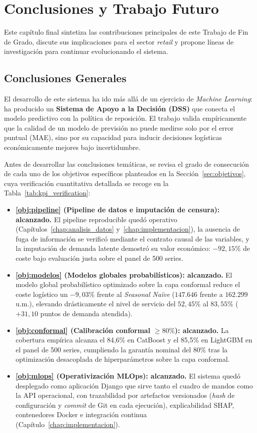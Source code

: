 \chapter{Conclusiones y Trabajo Futuro}
\label{chap:conclusiones}

Este capítulo final sintetiza las contribuciones principales de este Trabajo de Fin de Grado, discute sus implicaciones para el sector \textit{retail} y propone líneas de investigación para continuar evolucionando el sistema.

\section{Conclusiones Generales}
El desarrollo de este sistema ha ido más allá de un ejercicio de \textit{Machine Learning}: ha producido un \textbf{Sistema de Apoyo a la Decisión (DSS)} que conecta el modelo predictivo con la política de reposición. El trabajo valida empíricamente que la calidad de un modelo de previsión no puede medirse solo por el error puntual (MAE), sino por su capacidad para inducir decisiones logísticas económicamente mejores bajo incertidumbre.

Antes de desarrollar las conclusiones temáticas, se revisa el grado de consecución de cada uno de los objetivos específicos planteados en la Sección~\ref{sec:objetivos}, cuya verificación cuantitativa detallada se recoge en la Tabla~\ref{tab:kpi_verification}:

\begin{itemize}
    \item \textbf{\ref{obj:pipeline} (Pipeline de datos e imputación de censura): alcanzado.} El pipeline reproducible quedó operativo (Capítulos~\ref{chap:analisis_datos} y~\ref{chap:implementacion}), la ausencia de fuga de información se verificó mediante el contrato causal de las variables, y la imputación de demanda latente demostró su valor económico: $-92{,}15\%$ de coste bajo evaluación justa sobre el panel de 500 series.
    \item \textbf{\ref{obj:modelos} (Modelos globales probabilísticos): alcanzado.} El modelo global probabilístico optimizado sobre la capa conformal reduce el coste logístico un $-9{,}03\%$ frente al \textit{Seasonal Naïve} ($147.646$ frente a $162.299$ u.m.), elevando drásticamente el nivel de servicio del $52{,}45\%$ al $83{,}55\%$ ($+31{,}10$ puntos de demanda atendida).
    \item \textbf{\ref{obj:conformal} (Calibración conformal $\geq 80\%$): alcanzado.} La cobertura empírica alcanza el 84{,}6\% en CatBoost y el 85{,}5\% en LightGBM en el panel de 500 series, cumpliendo la garantía nominal del $80\%$ tras la optimización desacoplada de hiperparámetros sobre la capa conformal.
    \item \textbf{\ref{obj:mlops} (Operativización MLOps): alcanzado.} El sistema quedó desplegado como aplicación Django que sirve tanto el cuadro de mandos como la API operacional, con trazabilidad por artefactos versionados (\textit{hash} de configuración y \textit{commit} de Git en cada ejecución), explicabilidad SHAP, contenedores Docker e integración continua (Capítulo~\ref{chap:implementacion}).
\end{itemize}

